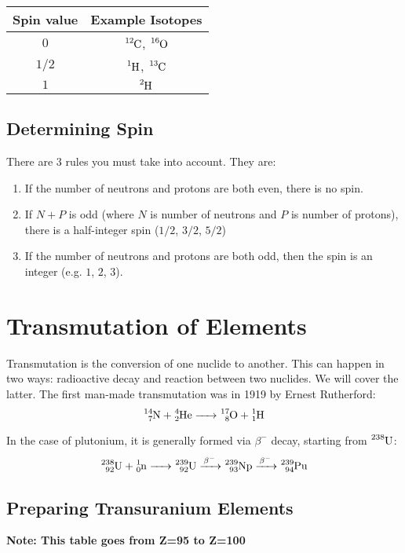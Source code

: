 \documentclass{article}
\begin{document}
\begin{multicols*}{2}
    \begin{tabular}{|c|c|}
      \hline
      Spin value & Example Isotopes \\
      \hline
      $0$ & $\ce{^{12}C}$, $\ce{^{16}O}$ \\
      $1/2$ & $\ce{^{1}H}$, $\ce{^{13}C}$ \\
      $1$ & $\ce{^{2}H}$ \\
      \hline
    \end{tabular}

    \subsection{Determining Spin}
    There are $3$ rules you must take into account. They are:
    \begin{enumerate}
      \item If the number of neutrons and protons are both even, there is no spin.
      \item If $N+P$ is odd (where $N$ is number of neutrons and $P$ is number of protons),
      there is a half-integer spin ($1/2$, $3/2$, $5/2$)
      \item If the number of neutrons and protons are both odd, then the spin is an integer
      (e.g. $1$, $2$, $3$).
    \end{enumerate}

    \section{Transmutation of Elements}
    Transmutation is the conversion of one nuclide to another. This can happen in two ways:
    radioactive decay and reaction between two nuclides. We will cover the latter. The first
    man-made transmutation was in 1919 by Ernest Rutherford:
    \[
      \ce{^{14}_7N + ^4_2{He} -> ^{17}_8O + ^1_1H}
    \]

    In the case of plutonium, it is generally formed via $\beta^{-}$ decay,
    starting from $\ce{^{238}U}$:
    \[
      \ce{^{238}_{92}U + ^1_0n -> ^{239}_{92}U ->[\beta^{-}] ^{239}_{93}Np ->[\beta^{-}] ^{239}_{94}Pu}
    \]

    \subsection{Preparing Transuranium Elements}
    \textbf{Note: This table goes from Z=95 to Z=100}\\


\end{multicols*}
\end{document}
